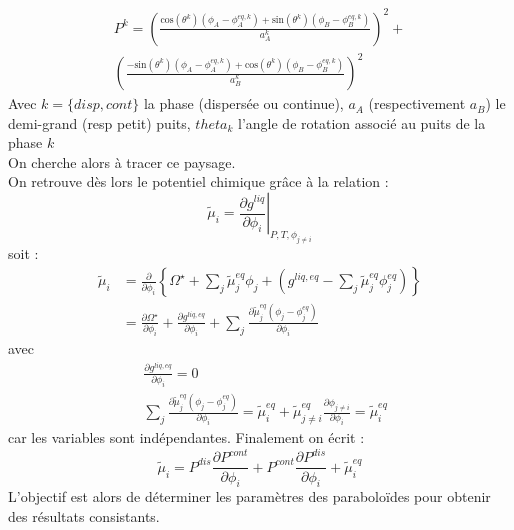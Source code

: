 \documentclass[a4paper,11pt]{report}    %
\newcommand{\co}[1]{\text{cos}\left(#1\right)}
\newcommand{\sinus}[1]{\text{sin}\left(#1\right)}
\begin{document}
\begin{multline}
	P^{k}=\left(\frac{\co{\theta^{k}}(\phi_{A}-\phi_{A}^{eq,k}) + \sinus{\theta^{k}}(\phi_{B}-\phi_{B}^{eq,k})}{a_{A}^{k}}\right)^{2}+\\ \left(\frac{-\sinus{\theta^{k}}(\phi_{A}-\phi_{A}^{eq,k}) + \co{\theta^{k}}(\phi_{B}-\phi_{B}^{eq,k})}{a_{B}^{k}}\right)^{2}
	\label{eq:paraboloid_general_}
\end{multline} 
Avec $k = \{disp,cont\}$ la phase (dispersée ou continue), $a_A$ (respectivement $a_B$) le demi-grand (resp petit) puits, $theta_k$ l'angle de rotation associé au puits de la phase $k$\\
On cherche alors à tracer ce paysage. \\
On retrouve dès lors le potentiel chimique grâce à la relation :
\begin{equation}\label{calul_potentiel}
	\tilde{\mu}_i = \left.\frac{\partial g^{liq}}{\partial \phi_i}\right|_{P,T,\phi_{j\neq i}} 
\end{equation}
soit : 
\begin{align*}
	\tilde{\mu}_i &= \frac{\partial}{\partial \phi_i}\left\lbrace 
	\Omega^{\star} + \sum_j \tilde{\mu}_j^{eq}\phi_j + \left( {g}^{liq,eq} -  \sum_j \tilde{\mu}_j^{eq}\phi_j^{eq} \right)\right\rbrace \\
	&= \frac{\partial \Omega^{\star}}{\partial \phi_i} + \frac{\partial g^{liq,eq}}{\partial \phi_i} + \sum_j \frac{\partial \tilde{\mu}_j^{eq}\left(\phi_j - \phi_j^{eq}\right)}{\partial  \phi_i}
\end{align*}
avec 
\begin{align*}
	& \frac{\partial g^{liq,eq}}{\partial \phi_i} = 0 \\
		& \sum_j \frac{\partial \tilde{\mu}_j^{eq}\left(\phi_j - \phi_j^{eq}\right)}{\partial  \phi_i} = \tilde{\mu}_i^{eq} +\tilde{\mu}_{j\neq i}^{eq} \frac{\partial \phi_{j\neq i}}{\partial \phi_i} = \tilde{\mu}_i^{eq}
\end{align*}
car les variables sont indépendantes. Finalement on écrit :
\begin{equation}
\tilde{\mu}_i =	P^{dis}\frac{\partial P^{cont}}{\partial \phi_i} + P^{cont}\frac{\partial P^{dis}}{\partial \phi_i} + \tilde{\mu}_i^{eq}
\end{equation}
L'objectif est alors de déterminer les paramètres des paraboloïdes pour obtenir des résultats consistants.
\end{document}
